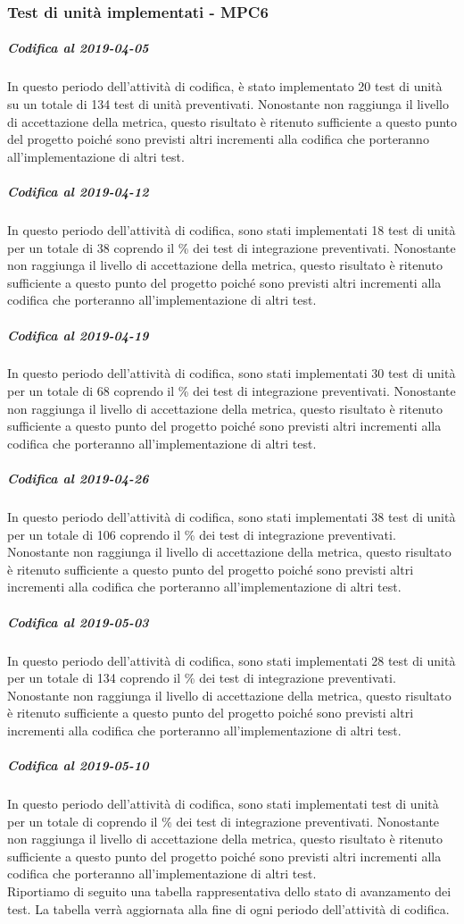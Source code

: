 \subsubsection{Test di unità implementati - MPC6}
\subparagraph{Codifica al 2019-04-05}
In questo periodo dell'attività di codifica, è stato implementato 20 test di unità su un totale di 134 test di unità preventivati.
Nonostante non raggiunga il livello di accettazione della
metrica, questo risultato è ritenuto sufficiente a questo punto del progetto poiché sono previsti altri incrementi alla codifica che porteranno all'implementazione di altri test.

\subparagraph{Codifica al 2019-04-12}
In questo periodo dell'attività di codifica, sono stati implementati 18 test di unità per un totale di 38 coprendo il \% dei test di integrazione preventivati.
Nonostante non raggiunga il livello di accettazione della
metrica, questo risultato è ritenuto sufficiente a questo punto del progetto poiché sono previsti altri incrementi alla codifica che porteranno all'implementazione di altri test.

\subparagraph{Codifica al 2019-04-19}
In questo periodo dell'attività di codifica, sono stati implementati 30 test di unità per un totale di 68 coprendo il \% dei test di integrazione preventivati.
Nonostante non raggiunga il livello di accettazione della
metrica, questo risultato è ritenuto sufficiente a questo punto del progetto poiché sono previsti altri incrementi alla codifica che porteranno all'implementazione di altri test.

\subparagraph{Codifica al 2019-04-26}
In questo periodo dell'attività di codifica, sono stati implementati 38 test di unità per un totale di 106 coprendo il \% dei test di integrazione preventivati.
Nonostante non raggiunga il livello di accettazione della
metrica, questo risultato è ritenuto sufficiente a questo punto del progetto poiché sono previsti altri incrementi alla codifica che porteranno all'implementazione di altri test.

\subparagraph{Codifica al 2019-05-03}
In questo periodo dell'attività di codifica, sono stati implementati 28 test di unità per un totale di 134 coprendo il \% dei test di integrazione preventivati.
Nonostante non raggiunga il livello di accettazione della
metrica, questo risultato è ritenuto sufficiente a questo punto del progetto poiché sono previsti altri incrementi alla codifica che porteranno all'implementazione di altri test.

\subparagraph{Codifica al 2019-05-10}
In questo periodo dell'attività di codifica, sono stati implementati  test di unità per un totale di  coprendo il \% dei test di integrazione preventivati.
Nonostante non raggiunga il livello di accettazione della
metrica, questo risultato è ritenuto sufficiente a questo punto del progetto poiché sono previsti altri incrementi alla codifica che porteranno all'implementazione di altri test.
\\Riportiamo di seguito una tabella rappresentativa dello stato di avanzamento dei test. La tabella verrà aggiornata alla fine di ogni periodo dell'attività di codifica.

